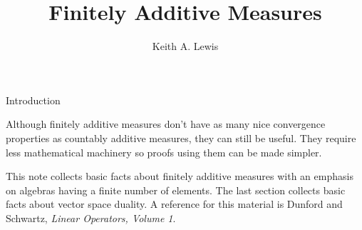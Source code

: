 \documentclass[fleqn]{amsart}
\title{Finitely Additive Measures}
\author{Keith A. Lewis}
\newcommand{\F}{\mathcal{F}}
\begin{document}
\maketitle

\begin{section}{Introduction}

Although finitely additive measures don't have as many nice convergence
properties as countably additive measures, they can still be useful.
They require less mathematical machinery so proofs using them can
be made simpler.

This note collects basic facts about finitely additive measures
with an emphasis on algebras having a finite number of
elements. The last section collects basic facts about
vector space duality. A reference for this material
is Dunford and Schwartz, {\em Linear Operators, Volume 1}.



\end{section}
\end{document}
